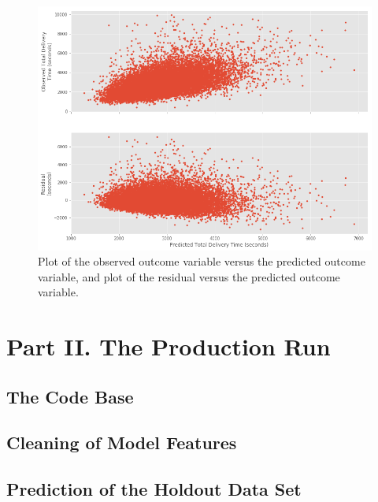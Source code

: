 \documentclass[12pt]{article}
\begin{document}
\begin{figure}[H]
\centering
\includegraphics[width=6in]{graphics/results.png}
\caption{Plot of the observed outcome variable versus the predicted outcome variable, and plot of the residual versus the predicted outcome variable.}
\label{fig:results01}
\end{figure}






\section{Part II. The Production Run}

\subsection{The Code Base}



\subsection{Cleaning of Model Features}


\subsection{Prediction of the Holdout Data Set}
\end{document}
